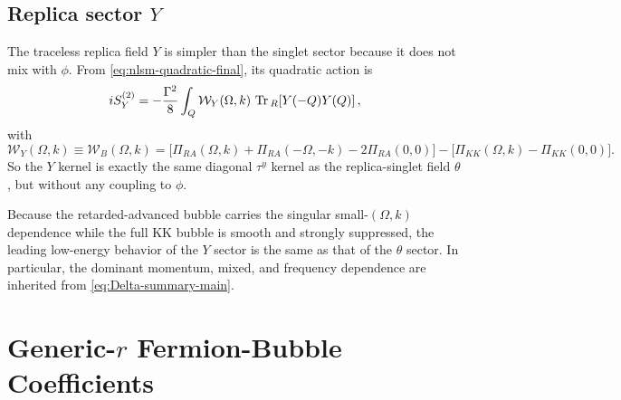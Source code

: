 \documentclass[aps,prx,preprint,amsmath,amssymb]{revtex4-2}
\newcommand{\Tr}{{\rm \, Tr\,}}
\begin{document}
\subsection{Replica sector \(Y\)}

The traceless replica field \(Y\) is simpler than the singlet sector because it
does not mix with \(\phi\).  From \eqref{eq:nlsm-quadratic-final}, its quadratic
action is
\begin{equation}\label{eq:Y-sector-general}
iS_Y^{(2)}
=
-\frac{\Gamma^2}{8}\int_Q \mathcal W_Y(\Omega,k)\,
\Tr_R\!\left[Y(-Q)Y(Q)\right],
\end{equation}
with
\begin{equation}\label{eq:Y-kernel-general}
\mathcal W_Y(\Omega,k)\equiv \mathcal W_B(\Omega,k)
=
\bigl[\Pi_{RA}(\Omega,k)+\Pi_{RA}(-\Omega,-k)-2\Pi_{RA}(0,0)\bigr]
-\bigl[\Pi_{KK}(\Omega,k)-\Pi_{KK}(0,0)\bigr].
\end{equation}
So the \(Y\) kernel is exactly the same diagonal \(\tau^y\) kernel as the
replica-singlet field \(\theta\), but without any coupling to \(\phi\).

Because the retarded-advanced bubble carries the singular
small-\((\Omega,k)\) dependence while the full KK bubble is smooth and strongly
suppressed, the leading low-energy behavior of the \(Y\) sector is the same as
that of the \(\theta\) sector.  In particular, the dominant momentum, mixed, and
frequency dependence are inherited from \eqref{eq:Delta-summary-main}.

\section{Generic-\texorpdfstring{$r$}{r} Fermion-Bubble Coefficients}
\label{sec:generic-r-bubbles}
\end{document}
